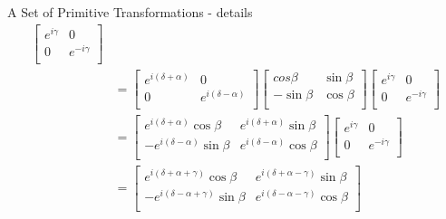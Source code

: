 \documentclass{beamer}
\begin{document}
\begin{frame}{A Set of Primitive Transformations - details}
{\begin{align*}
      \begin{bmatrix} 
        e^{i\gamma}  & 0 \\
        0 & e^{-i\gamma} \\
      \end{bmatrix}  \\
      &= 
      \begin{bmatrix} 
        e^{i(\delta + \alpha)}  & 0 \\
        0 & e^{i(\delta - \alpha)} \\
      \end{bmatrix} 
      \begin{bmatrix} 
        cos \beta & \sin \beta \\
        - \sin \beta & \cos \beta \\
      \end{bmatrix} 
      \begin{bmatrix} 
        e^{i\gamma}  & 0 \\
        0 & e^{-i\gamma} \\
      \end{bmatrix} \\
      &=
      \begin{bmatrix} 
        e^{i(\delta + \alpha)} \cos \beta  & e^{i(\delta + \alpha)} \sin \beta \\
        -e^{i(\delta - \alpha)} \sin \beta & e^{i(\delta - \alpha)} \cos \beta \\
      \end{bmatrix} 
      \begin{bmatrix} 
        e^{i\gamma}  & 0 \\
        0 & e^{-i\gamma} \\
      \end{bmatrix} \\
      &=
      \begin{bmatrix} 
        e^{i(\delta + \alpha + \gamma)} \cos \beta  & e^{i(\delta + \alpha - \gamma)} \sin \beta \\
        -e^{i(\delta - \alpha + \gamma)} \sin \beta & e^{i(\delta - \alpha - \gamma)} \cos \beta \\
      \end{bmatrix} 
    \end{align*}
  }%
\end{frame}
\end{document}

